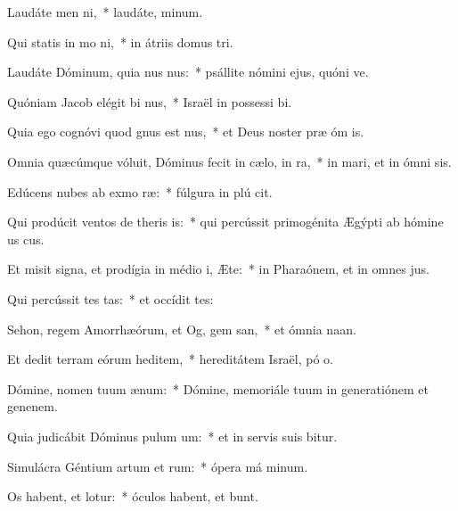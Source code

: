 \item Laudáte men ni,~* laudáte,  minum.
\item Qui statis in mo ni,~* in átriis domus  tri.
\item Laudáte Dóminum, quia nus nus:~* psállite nómini ejus, quóni ve.
\item Quóniam Jacob elégit bi nus,~* Israël in possessi bi.
\item Quia ego cognóvi quod gnus est nus,~* et Deus noster præ óm is.
\item Omnia quæcúmque vóluit, Dóminus fecit in cælo,  in ra,~* in mari, et in ómni sis.
\item Edúcens nubes ab exmo ræ:~* fúlgura in plú cit.
\item Qui prodúcit ventos de theris is:~* qui percússit primogénita Ægýpti ab hómine us  cus.
\item Et misit signa, et prodígia in médio i, Æte:~* in Pharaónem, et in omnes  jus.
\item Qui percússit tes tas:~* et occídit  tes:
\item Sehon, regem Amorrhæórum, et Og, gem san,~* et ómnia  naan.
\item Et dedit terram eórum heditem,~* hereditátem Israël, pó o.
\item Dómine, nomen tuum  ænum:~* Dómine, memoriále tuum in generatiónem et genenem.
\item Quia judicábit Dóminus pulum um:~* et in servis suis bitur.
\item Simulácra Géntium artum et rum:~* ópera má minum.
\item Os habent, et  lotur:~* óculos habent, et  bunt.
